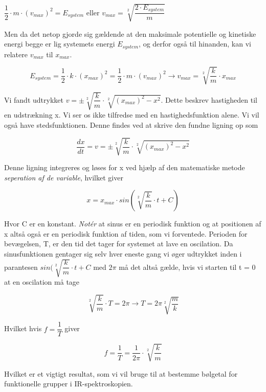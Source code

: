 \bigskip
\begin{center}
$\dfrac{1}{2} \cdot m \cdot (v_{max})^2 = E_{system}$ eller $v_{max} = \sqrt[2]{\dfrac{2 \cdot E_{system}}{m}}$
\end{center}
\bigskip

Men da det netop gjorde sig gældende at den maksimale potentielle og kinetiske energi begge er lig systemets energi $E_{system}$, og derfor også til hinanden, kan vi relatere $v_{max}$ til $x_{max}$.

\begin{center}
\begin{equation}
E_{system} = \dfrac{1}{2} \cdot k \cdot (x_{max})^2 = \dfrac{1}{2} \cdot m \cdot (v_{max})^2 \rightarrow v_{max} = \sqrt[2]{\dfrac{k}{m}} \cdot x_{max}
\end{equation}
\end{center}

Vi fandt udtrykket $v = \pm \sqrt[2]{\dfrac{k}{m}} \cdot \sqrt[2]{(x_{max})^2-x^2}$. Dette beskrev hastigheden til en udstrækning x. Vi ser os ikke tilfredse med en hastighedsfunktion alene. Vi vil også have stedsfunktionen. Denne findes ved at skrive den fundne ligning op som 

\begin{center}
\begin{equation}
\dfrac{dx}{dt} = v = \pm \sqrt[2]{\dfrac{k}{m}} \cdot \sqrt[2]{(x_{max})^2-x^2}
\end{equation}
\end{center}

Denne ligning integreres og løses for x ved hjælp af den matematiske metode \emph{seperation af de variable}, hvilket giver

\begin{center}
\begin{equation}
x = x_{max} \cdot sin(\sqrt[2]{\dfrac{k}{m}} \cdot t + C)
\end{equation}
\end{center}
\bigskip
Hvor C er en konstant. \emph{Notér} at sinus er en periodisk funktion og at positionen af x altså også er en periodisk funktion af tiden, som vi forventede. Perioden for bevægelsen, T, er den tid det tager for systemet at lave en oscilation. Da sinusfunktionen gentager sig selv hver eneste gang vi øger udtrykket inden i parantesen $sin(\sqrt[2]{\dfrac{k}{m}} \cdot t + C$ med $2 \pi$ må det altså gælde, hvis vi starten til t = 0 at en oscilation må tage

\begin{center}
\begin{equation}
\sqrt[2]{\dfrac{k}{m}} \cdot T = 2 \pi \rightarrow T = 2 \pi \sqrt[2]{\dfrac{m}{k}}
\end{equation}
\end{center}

Hvilket hvis $f = \dfrac{1}{T}$ giver

\begin{center}
\begin{equation}
f = \dfrac{1}{T} = \dfrac{1}{2 \pi} \cdot \sqrt[2]{\dfrac{k}{m}}
\end{equation}
\end{center}

Hvilket er et vigtigt resultat, som vi vil bruge til at bestemme bølgetal for funktionelle grupper i IR-spektroskopien. 